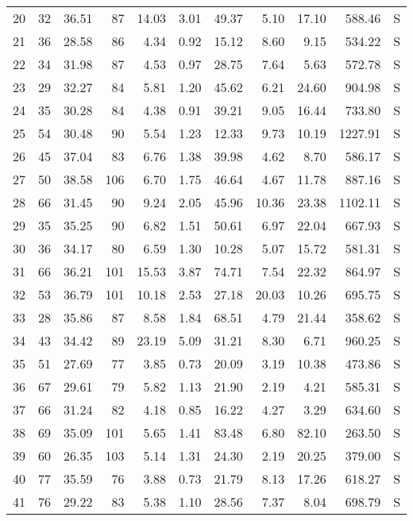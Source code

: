 \begin{table}[ht]
\begin{tabular}{rrrrrrrrrrl}
  20 &  32 & 36.51 &  87 & 14.03 & 3.01 & 49.37 & 5.10 & 17.10 & 588.46 & S \\ 
  21 &  36 & 28.58 &  86 & 4.34 & 0.92 & 15.12 & 8.60 & 9.15 & 534.22 & S \\ 
  22 &  34 & 31.98 &  87 & 4.53 & 0.97 & 28.75 & 7.64 & 5.63 & 572.78 & S \\ 
  23 &  29 & 32.27 &  84 & 5.81 & 1.20 & 45.62 & 6.21 & 24.60 & 904.98 & S \\ 
  24 &  35 & 30.28 &  84 & 4.38 & 0.91 & 39.21 & 9.05 & 16.44 & 733.80 & S \\ 
  25 &  54 & 30.48 &  90 & 5.54 & 1.23 & 12.33 & 9.73 & 10.19 & 1227.91 & S \\ 
  26 &  45 & 37.04 &  83 & 6.76 & 1.38 & 39.98 & 4.62 & 8.70 & 586.17 & S \\ 
  27 &  50 & 38.58 & 106 & 6.70 & 1.75 & 46.64 & 4.67 & 11.78 & 887.16 & S \\ 
  28 &  66 & 31.45 &  90 & 9.24 & 2.05 & 45.96 & 10.36 & 23.38 & 1102.11 & S \\ 
  29 &  35 & 35.25 &  90 & 6.82 & 1.51 & 50.61 & 6.97 & 22.04 & 667.93 & S \\ 
  30 &  36 & 34.17 &  80 & 6.59 & 1.30 & 10.28 & 5.07 & 15.72 & 581.31 & S \\ 
  31 &  66 & 36.21 & 101 & 15.53 & 3.87 & 74.71 & 7.54 & 22.32 & 864.97 & S \\ 
  32 &  53 & 36.79 & 101 & 10.18 & 2.53 & 27.18 & 20.03 & 10.26 & 695.75 & S \\ 
  33 &  28 & 35.86 &  87 & 8.58 & 1.84 & 68.51 & 4.79 & 21.44 & 358.62 & S \\ 
  34 &  43 & 34.42 &  89 & 23.19 & 5.09 & 31.21 & 8.30 & 6.71 & 960.25 & S \\ 
  35 &  51 & 27.69 &  77 & 3.85 & 0.73 & 20.09 & 3.19 & 10.38 & 473.86 & S \\ 
  36 &  67 & 29.61 &  79 & 5.82 & 1.13 & 21.90 & 2.19 & 4.21 & 585.31 & S \\ 
  37 &  66 & 31.24 &  82 & 4.18 & 0.85 & 16.22 & 4.27 & 3.29 & 634.60 & S \\ 
  38 &  69 & 35.09 & 101 & 5.65 & 1.41 & 83.48 & 6.80 & 82.10 & 263.50 & S \\ 
  39 &  60 & 26.35 & 103 & 5.14 & 1.31 & 24.30 & 2.19 & 20.25 & 379.00 & S \\ 
  40 &  77 & 35.59 &  76 & 3.88 & 0.73 & 21.79 & 8.13 & 17.26 & 618.27 & S \\ 
  41 &  76 & 29.22 &  83 & 5.38 & 1.10 & 28.56 & 7.37 & 8.04 & 698.79 & S \\ 

\end{tabular}
\end{table}
